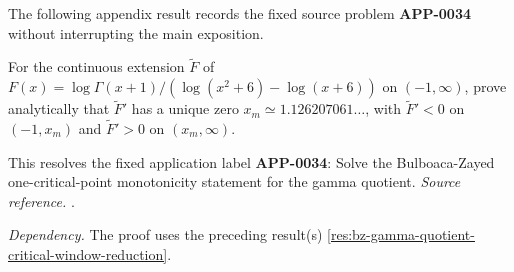 The following appendix result records the fixed source problem \textbf{APP-0034} \cite{app-app-0009-source} without interrupting the main exposition.
\begin{corollary}
\label{res:bulboaca-zayed-gamma-quotient-full-monotonicity}
For the continuous extension \(\widetilde F\) of \(F(x)=\log\Gamma(x+1)/(\log(x^2+6)-\log(x+6))\) on \((-1,\infty)\), prove analytically that \(\widetilde F'\) has a unique zero \(x_m\simeq1.126207061\ldots\), with \(\widetilde F'<0\) on \((-1,x_m)\) and \(\widetilde F'>0\) on \((x_m,\infty)\).

This resolves the fixed application label \textbf{APP-0034}: Solve the Bulboaca-Zayed one-critical-point monotonicity statement for the gamma quotient.
\emph{Source reference.} \cite{app-app-0009-source}.

\emph{Dependency.} The proof uses the preceding result(s) \ref{res:bz-gamma-quotient-critical-window-reduction}.
\end{corollary}
